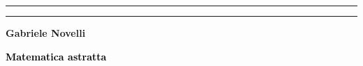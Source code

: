 \documentclass[12pt,a4paper]{report}
\theoremstyle{definition}
\theoremstyle{Theorem}
\theoremstyle{definition}
\theoremstyle{definition}
\theoremstyle{definition}
\begin{document}
	\begin{frontespizio}
			\begin{titlepage}
			\begin{center}
				\rule[0.1cm]{15.8cm}{0.1mm}
				\rule[0.5cm]{15.8cm}{0.6mm}
				
				{\small{\bf Gabriele Novelli}}
				
			\end{center}
			
			\vspace{23mm}
			
			\begin{center}\textcolor{black}{
					{\LARGE{\bf Matematica astratta }}
			}\end{center}
			\vspace{50mm} \par \noindent
			
		\end{titlepage}
		\end{frontespizio}
	\tableofcontents
	\newpage
	\thispagestyle{empty}
	\mbox{}
	\newpage
\end{document}
